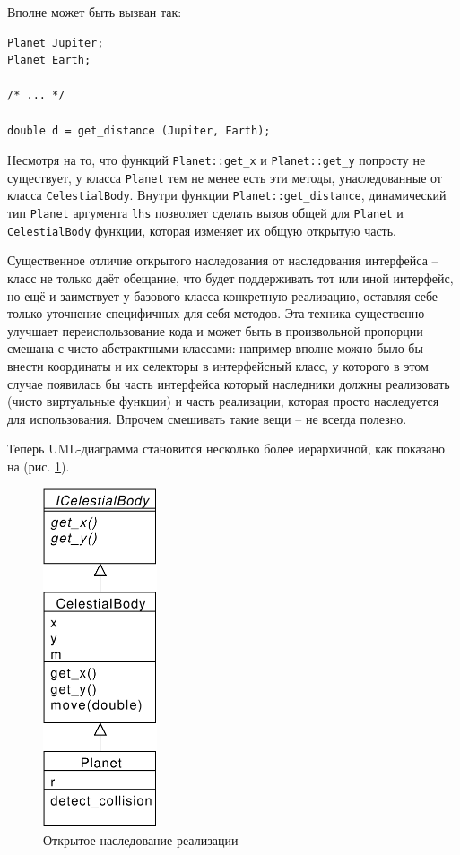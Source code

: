 \documentclass[a4paper,12pt,oneside]{article}
\begin{document}
Вполне может быть вызван так:

\begin{lstlisting}
Planet Jupiter;
Planet Earth;

/* ... */

double d = get_distance (Jupiter, Earth);
\end{lstlisting}

Несмотря на то, что функций \lstinline!Planet::get_x! и \lstinline!Planet::get_y! попросту не существует, у класса \lstinline!Planet! тем не менее есть эти методы, унаследованные от класса \lstinline!CelestialBody!. Внутри функции \lstinline!Planet::get_distance!, динамический тип \lstinline!Planet! аргумента \lstinline!lhs! позволяет сделать вызов общей для \lstinline!Planet! и \lstinline!CelestialBody! функции, которая изменяет их общую открытую часть.

Существенное отличие открытого наследования от наследования интерфейса -- класс не только даёт обещание, что будет поддерживать тот или иной интерфейс, но ещё и заимствует у базового класса конкретную реализацию, оставляя себе только уточнение специфичных для себя методов. Эта техника существенно улучшает переиспользование кода и может быть в произвольной пропорции смешана с чисто абстрактными классами: например вполне можно было бы внести координаты и их селекторы в интерфейсный класс, у которого в этом случае появилась бы часть интерфейса который наследники должны реализовать (чисто виртуальные функции) и часть реализации, которая просто наследуется для использования. Впрочем смешивать такие вещи -- не всегда полезно.

Теперь UML-диаграмма становится несколько более иерархичной, как показано на (рис. \ref{fig:inheritance-implementation}).

\begin{figure}[h!]
\centering
\includegraphics[width=0.3\textwidth]{illustrations/impl-inheritance-crop.pdf}
\caption{Открытое наследование реализации}
\label{fig:inheritance-implementation}
\end{figure}
\end{document}
